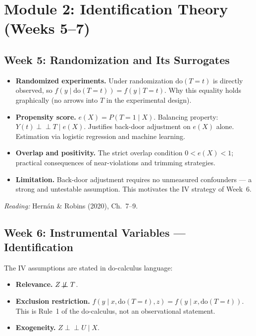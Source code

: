 \documentclass[12pt]{article}
\begin{document}
\section{Module 2: Identification Theory (Weeks 5--7)}

\subsection{Week 5: Randomization and Its Surrogates}

\begin{itemize}
  \item \textbf{Randomized experiments.}
    Under randomization $\mathrm{do}(T{=}t)$ is directly observed, so
    $f(y \mid \mathrm{do}(T{=}t)) = f(y \mid T{=}t)$.
    Why this equality holds graphically (no arrows into $T$ in the
    experimental design).

  \item \textbf{Propensity score.}
    $e(X) = P(T{=}1 \mid X)$.  Balancing property:
    $Y(t) \perp\!\!\!\perp T \mid e(X)$.
    Justifies back-door adjustment on $e(X)$ alone.
    Estimation via logistic regression and machine learning.

  \item \textbf{Overlap and positivity.}
    The strict overlap condition $0 < e(X) < 1$; practical consequences
    of near-violations and trimming strategies.

  \item \textbf{Limitation.}
    Back-door adjustment requires no unmeasured confounders --- a strong
    and untestable assumption. This motivates the IV strategy of Week~6.
\end{itemize}

\noindent\textit{Reading:} Hern\'an \& Robins (2020), Ch.~7--9.

\subsection{Week 6: Instrumental Variables --- Identification}

The IV assumptions are stated in do-calculus language:
\begin{itemize}
  \item \textbf{Relevance.}  $Z \not\!\perp\!\!\!\perp T$.
  \item \textbf{Exclusion restriction.}
    $f(y \mid x, \mathrm{do}(T{=}t), z) = f(y \mid x, \mathrm{do}(T{=}t))$.
    This is Rule~1 of the do-calculus, not an observational statement.
  \item \textbf{Exogeneity.}  $Z \perp\!\!\!\perp U \mid X$.
\end{itemize}
\end{document}
